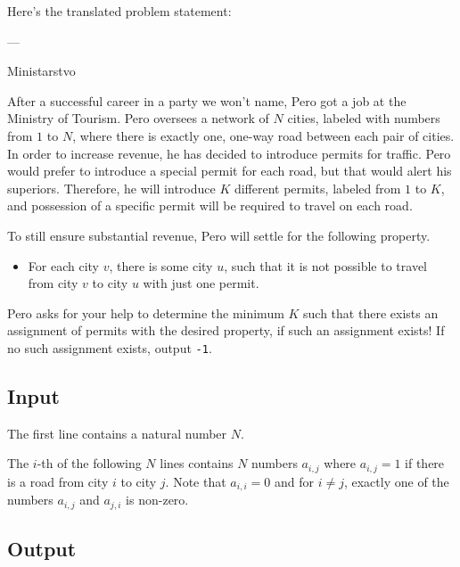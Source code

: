Here's the translated problem statement:

---

\begin{statement}[
  problempoints=100,
  timelimit=1 second,
  memorylimit=1024 MiB,
]{Ministarstvo}

After a successful career in a party we won't name, Pero got a job at the Ministry of Tourism. Pero oversees a network of $N$ cities, labeled with numbers from $1$ to $N$, where there is exactly one, one-way road between each pair of cities. In order to increase revenue, he has decided to introduce permits for traffic. Pero would prefer to introduce a special permit for each road, but that would alert his superiors. Therefore, he will introduce $K$ different permits, labeled from $1$ to $K$, and possession of a specific permit will be required to travel on each road.

To still ensure substantial revenue, Pero will settle for the following property.

\begin{itemize}
\item For each city $v$, there is some city $u$, such that it is not possible to travel from city $v$ to city $u$ with just one permit.
\end{itemize} 

Pero asks for your help to determine the minimum $K$ such that there exists an assignment of permits with the desired property, if such an assignment exists! If no such assignment exists, output \texttt{-1}. 

\subsection*{Input}

The first line contains a natural number $N$.

The $i$-th of the following $N$ lines contains $N$ numbers $a_{i, j}$ where $a_{i, j} = 1$ if there is a road from city $i$ to city $j$. Note that $a_{i, i} = 0$ and for $i \neq j$, exactly one of the numbers $a_{i, j}$ and $a_{j, i}$ is non-zero. 

\subsection*{Output}


\end{statement}
